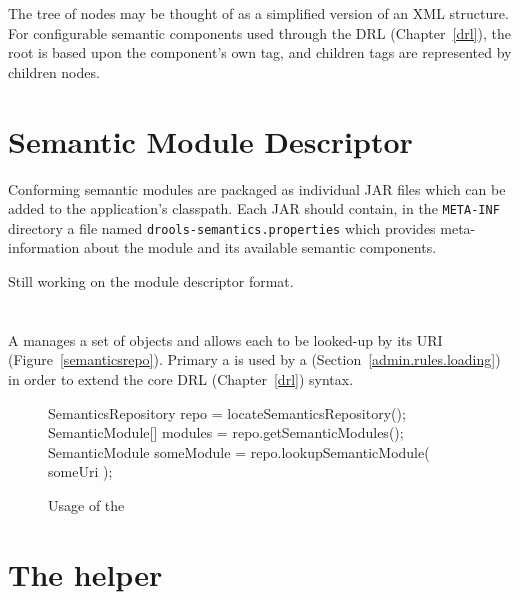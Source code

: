 The tree of  nodes may be thought of as
a simplified version of an XML structure.  For configurable semantic
components used through the DRL (Chapter~\vref{drl}), the root 
 is based upon the component's own tag, and
children tags are represented by children 
nodes.

\section{Semantic Module Descriptor}
\label{module.descriptor}

Conforming semantic modules are packaged as individual JAR files which
can be added to the application's classpath.  Each JAR should contain,
in the \texttt{META-INF} directory a file named
\texttt{drools-semantics.properties} which provides meta-information about
the module and its available semantic components.

\begin{implnote}
Still working on the module descriptor format.
\end{implnote}

\section{}

A  manages a set of
 objects and allows each to be looked-up
by its URI (Figure~\vref{semanticsrepo}).  Primary a  is used by
a  (Section~\vref{admin.rules.loading})
in order to extend the core DRL (Chapter~\vref{drl}) syntax.

\begin{figure}
\begin{javaCodelisting}
SemanticsRepository repo       = locateSemanticsRepository();
SemanticModule[]    modules    = repo.getSemanticModules();
SemanticModule      someModule = repo.lookupSemanticModule( someUri );
\end{javaCodelisting}
\caption{Usage of the }
\label{semanticsrepo}
\end{figure}

\section{The  helper}

